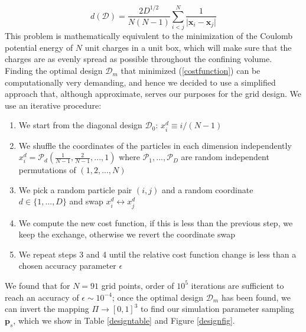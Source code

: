 \documentclass[reprint,aps,prd,superscriptaddress,showkeys]{revtex4-1}
\begin{document}
\begin{equation}
\label{costfunction}
d(\mathcal{D}) = \frac{2D^{1/2}}{N(N-1)}\sum_{i<j}^N\frac{1}{\vert\mathbf{x}_i-\mathbf{x}_j\vert}
\end{equation} 
%
This problem is mathematically equivalent to the minimization of the Coulomb potential energy of $N$ unit charges in a unit box, which will make sure that the charges are as evenly spread as possible throughout the confining volume. Finding the optimal design $\mathcal{D}_m$ that minimized (\ref{costfunction}) can be computationally very demanding, and hence we decided to use a simplified approach that, although approximate, serves our purposes for the grid design. We use an iterative procedure:
\begin{enumerate}
\item We start from the diagonal design $\mathcal{D}_0$: $x_i^d\equiv i/(N-1)$
\item We shuffle the coordinates of the particles in each dimension independently $x_i^d = \mathcal{P}_d\left(\frac{1}{N-1},\frac{2}{N-1},...,1\right)$ where $\mathcal{P}_1,...,\mathcal{P}_D$ are random independent permutations of $(1,2,...,N)$
\item We pick a random particle pair $(i,j)$ and a random coordinate $d\in\{1,...,D\}$ and swap $x_i^d\leftrightarrow x_j^d$
\item We compute the new cost function, if this is less than the previous step, we keep the exchange, otherwise we revert the coordinate swap
\item We repeat steps 3 and 4 until the relative cost function change is less than a chosen accuracy parameter $\epsilon$ 
\end{enumerate}
%
We found that for $N=91$ grid points, order of $10^5$ iterations are sufficient to reach an accuracy of $\epsilon\sim10^{-4}$; once the optimal design $\mathcal{D}_m$ has been found, we can invert the mapping $\Pi\rightarrow[0,1]^3$ to find our simulation parameter sampling $\mathbf{p}_s$, which we show in Table \ref{designtable} and Figure \ref{designfig}.
%
\end{document}
